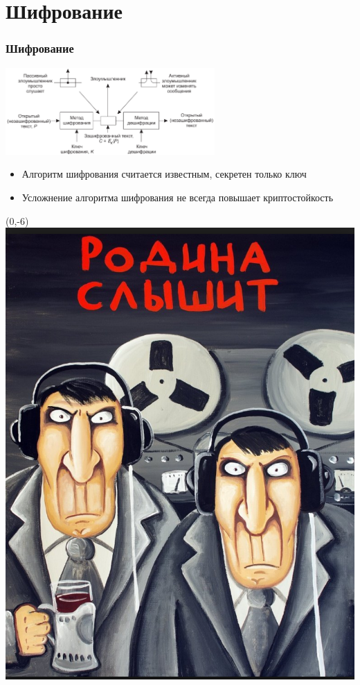 \documentclass{../../slides-style}
\begin{document}
    \section{Шифрование}

    \begin{frame}
        \frametitle{Шифрование}
        \begin{center}
            \includegraphics[width=0.6\textwidth]{cryptography.png}
        \end{center}
        \begin{itemize}
            \item Алгоритм шифрования считается известным, секретен только ключ
            \item Усложнение алгоритма шифрования не всегда повышает криптостойкость
        \end{itemize}
        \begin{textblock}{2}(0,-6)
            \includegraphics[width=\textwidth]{youAreBeingWatched.png}
        \end{textblock}
    \end{frame}
\end{document}
